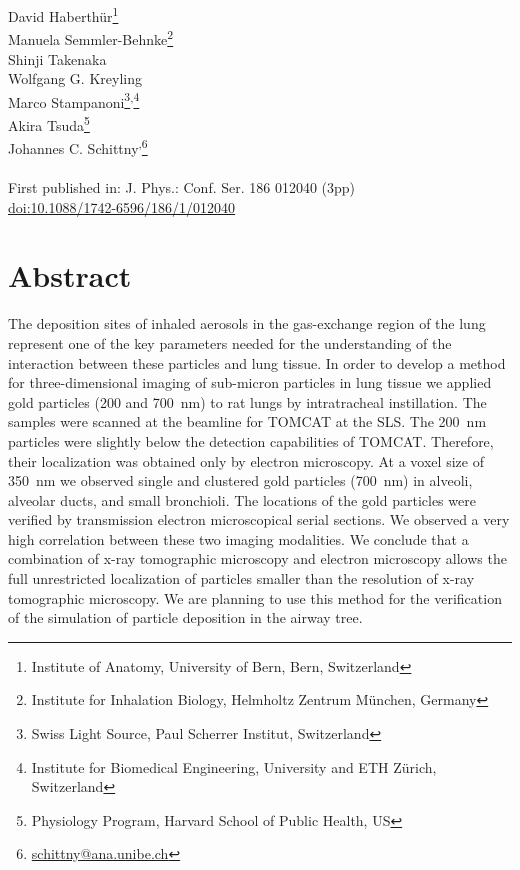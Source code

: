 \label{ch:xrm2008}

\newcommand{\footremember}[2]{\footnote{#2}\newcounter{#1}\setcounter{#1}{\value{footnote}}}%
\newcommand{\footrecall}[1]{\footnotemark[\value{#1}]} 

David Haberthür\footremember{ana}{Institute of Anatomy, University of Bern, Bern, Switzerland}\\
Manuela Semmler-Behnke\footremember{inhalation}{Institute for Inhalation Biology, Helmholtz Zentrum München, Germany}\\
Shinji Takenaka\footrecall{inhalation}\\
Wolfgang G. Kreyling\footrecall{inhalation}\\
Marco Stampanoni\footremember{psi}{Swiss Light Source, Paul Scherrer Institut, Switzerland}\textsuperscript{,}\footremember{eth}{Institute for Biomedical Engineering, University and ETH Zürich, Switzerland}\\
Akira Tsuda\footnote{Physiology Program, Harvard School of Public Health, US}\\
Johannes C. Schittny\footrecall{ana}\textsuperscript{,}\footnote{\href{mailto:schittny@ana.unibe.ch}{schittny@ana.unibe.ch}}\\\\
First published in: J. Phys.: Conf. Ser. 186 012040 (3pp)\\
\href{http://dx.doi.org/10.1088/1742-6596/186/1/012040}{doi:10.1088/1742-6596/186/1/012040}

\section{Abstract}
The deposition sites of inhaled aerosols in the gas-exchange region of the lung represent one of the key parameters needed for the understanding of the interaction between these particles and lung tissue. In order to develop a method for three-dimensional imaging of sub-micron particles in lung tissue we applied gold particles (200 and \SI{700}{\nano\meter}) to rat lungs by intratracheal instillation. The samples were scanned at the beamline for \acf{TOMCAT} at the \acl{SLS}. The \SI{200}{\nano\meter} particles were slightly below the detection capabilities of \acs{TOMCAT}. Therefore, their localization was obtained only by electron microscopy. At a voxel size of \SI{350}{\nano\meter} we observed single and clustered gold particles (\SI{700}{\nano\meter}) in alveoli, alveolar ducts, and small bronchioli. The locations of the gold particles were verified by transmission electron microscopical serial sections. We observed a very high correlation between these two imaging modalities. We conclude that a combination of x-ray tomographic microscopy and electron microscopy allows the full unrestricted \threed localization of particles smaller than the resolution of x-ray tomographic microscopy. We are planning to use this method for the verification of the simulation of particle deposition in the airway tree.

